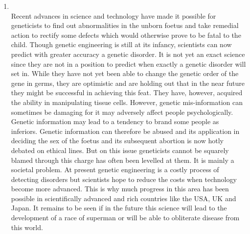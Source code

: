 \documentclass[12pt]{article}
\begin{document}
\begin{enumerate}
    \item {}\\
      Recent advances in science and technology have made it possible for geneticists to find out abnormalities in the unborn foetus and take remedial action to rectify some defects which would otherwise prove to be fatal to the child. Though genetic engineering is still at its infancy, scientists can now predict with greater accuracy a genetic disorder. It is not yet an exact science since they are not in a position to predict when exactly a genetic disorder will set in. While they have not yet been able to change the genetic order of the gene in germs, they are optimistic and are holding out that in the near future they might be successful in achieving this feat. They have, however, acquired the ability in manipulating tissue cells. However, genetic mis-information can sometimes be damaging for it may adversely affect people psychologically. Genetic information may lead to a tendency to brand some people as inferiors. Genetic information can therefore be abused and its application in deciding the sex of the foetus and its subsequent abortion is now hotly debated on ethical lines. But on this issue geneticists cannot be squarely blamed through this charge has often been levelled at them. It is mainly a societal problem. At present genetic engineering is a costly process of detecting disorders but scientists hope to reduce the costs when technology become more advanced. This is why much progress in this area has been possible in scientifically advanced and rich countries like the USA, UK and Japan. It remains to be seen if in the future this science will lead to the development of a race of superman or will be able to obliterate disease from this world.


\end{enumerate}
\end{document}
